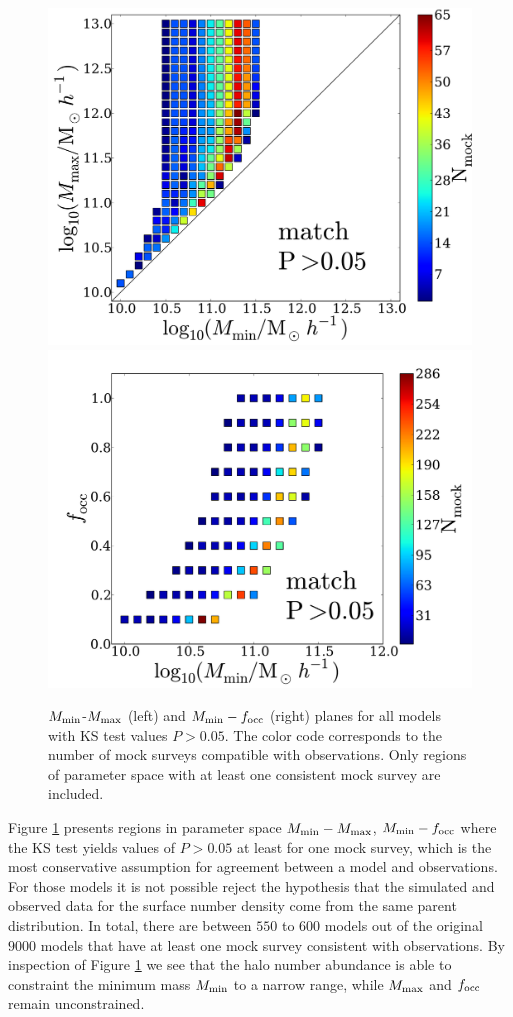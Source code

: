 \documentclass[usenatbib]{mn2e}
\begin{document}
\begin{figure}
\begin{center}
\includegraphics[width=0.46\linewidth,angle=0]{./plots/Fig2_match_P5.pdf}
\vspace{5mm}
\includegraphics[width=0.49\linewidth,angle=0]{./plots/Fig3_match_P5.pdf}
\end{center} 
\caption{$M_{\rm min}$-$M_{\rm max}$ (left) and $M_{\rm    min}-f_{\rm
    occ}$ (right) planes for all models with  KS test values
  $P>0.05$. The color code corresponds to the number of  mock surveys
  compatible with observations. Only regions of parameter  space with
  at least one consistent mock survey are  included. \label{fig:landscape}}     
\end{figure}


Figure \ref{fig:landscape} presents regions in parameter space $M_{\rm
min}-M_{\rm max}$, $M_{\rm min}-f_{\rm occ}$ where the KS test yields
values of $P>0.05$ at least for one mock survey, which is the most
conservative assumption for agreement between a model and observations. For those models it
is not possible reject the hypothesis that the simulated and observed
data for the surface number density come from the same parent
distribution. In total, there are between $550$ to $600$ models out of
the original $9000$ models that have at least one mock survey
consistent with observations. By inspection of Figure
\ref{fig:landscape} we see that the halo number abundance is able to
constraint the minimum mass $M_{\rm min}$ to a narrow range, while
$M_{\rm max}$ and $f_{\rm occ}$ remain unconstrained.
\end{document}
